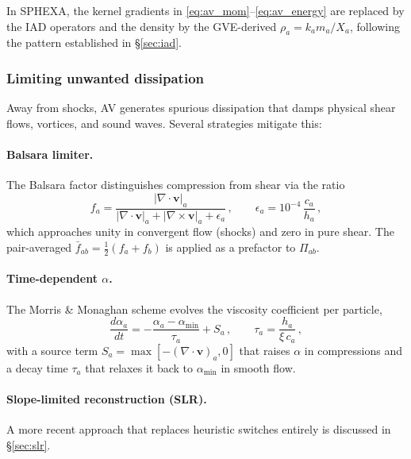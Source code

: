 In SPHEXA, the kernel gradients in \eqref{eq:av_mom}--\eqref{eq:av_energy} are replaced by the IAD operators and the density by the GVE-derived $\rho_a = k_a m_a / X_a$, following the pattern established in \S\ref{sec:iad}.


\subsubsection*{Limiting unwanted dissipation}

Away from shocks, AV generates spurious dissipation that damps physical shear flows, vortices, and sound waves. Several strategies mitigate this:

\paragraph{Balsara limiter.} The Balsara factor \cite{Balsara1995} distinguishes compression from shear via the ratio
\begin{equation}
    f_a = \frac{|\nabla \cdot \mathbf{v}|_a}{|\nabla \cdot \mathbf{v}|_a + |\nabla \times \mathbf{v}|_a + \epsilon_a}\,, \qquad \epsilon_a = 10^{-4}\,\frac{c_a}{h_a}\,,
    \label{eq:balsara}
\end{equation}
which approaches unity in convergent flow (shocks) and zero in pure shear. The pair-averaged $\bar{f}_{ab} = \tfrac{1}{2}(f_a + f_b)$ is applied as a prefactor to $\Pi_{ab}$.

\paragraph{Time-dependent $\alpha$.} The Morris \& Monaghan scheme \cite{MorrisMonaghan1997} evolves the viscosity coefficient per particle,
\begin{equation}
    \frac{d\alpha_a}{dt} = -\frac{\alpha_a - \alpha_\mathrm{min}}{\tau_a} + S_a\,, \qquad \tau_a = \frac{h_a}{\xi\, c_a}\,,
    \label{eq:mm97}
\end{equation}
with a source term $S_a = \max[-(\nabla \cdot \mathbf{v})_a, 0]$ that raises $\alpha$ in compressions and a decay time $\tau_a$ that relaxes it back to $\alpha_\mathrm{min}$ in smooth flow.

\paragraph{Slope-limited reconstruction (SLR).} A more recent approach that replaces heuristic switches entirely is discussed in \S\ref{sec:slr}.



